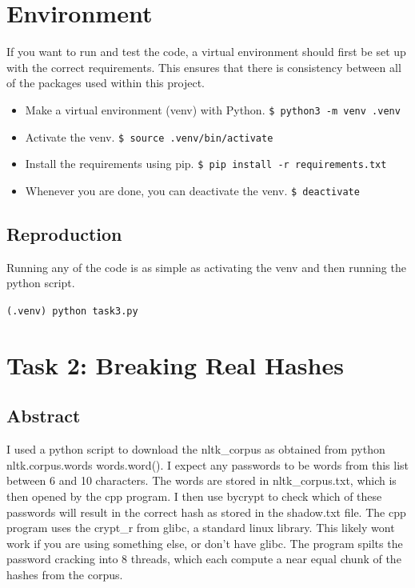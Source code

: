 \documentclass[11pt]{article}
\begin{document}
\section*{Environment}
If you want to run and test the code, a virtual environment should first be set up with the correct requirements. This ensures that there is consistency between all of the packages used within this project.

\begin{itemize}
	\item Make a virtual environment (venv) with Python.
		\verb|$ python3 -m venv .venv|
	\item Activate the venv.
		\verb|$ source .venv/bin/activate|
	\item Install the requirements using pip.
		\verb|$ pip install -r requirements.txt|
	\item Whenever you are done, you can deactivate the venv.
		\verb|$ deactivate|
\end{itemize}

\subsection*{Reproduction}
Running any of the code is as simple as activating the venv and then running the python script.

\verb|(.venv) python task3.py|

\section*{Task 2: Breaking Real Hashes}
\subsection*{Abstract}
I used a python script to download the nltk\_corpus as obtained from python nltk.corpus.words words.word(). I expect any passwords to be words from this list between 6 and 10 characters. The words are stored in nltk\_corpus.txt, which is then opened by the cpp program. I then use bycrypt to check which of these passwords will result in the correct hash as stored in the shadow.txt file. The cpp program uses the crypt\_r from glibc, a standard linux library. This likely wont work if you are using something else, or don't have glibc. The program spilts the password cracking into 8 threads, which each compute a near equal chunk of the hashes from the corpus.
\end{document}
